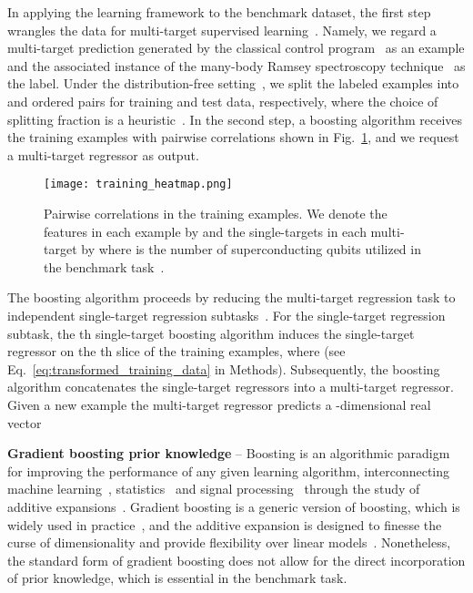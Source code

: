 \documentclass[aps,twocolumn,superscriptaddress,floatfix,preprintnumbers,showkeys]{revtex4}
\begin{document}
In applying the learning framework to the benchmark dataset, the first step wrangles the data for multi-target supervised learning~\cite{Borchani_2015, Waegeman_2019}. Namely, we regard a multi-target prediction generated by the classical control program~\cite{Roushan_2017, Neill_2018, Chiaro_2019} as an example and the associated instance of the many-body Ramsey spectroscopy technique~\cite{Roushan_2017} as the label. Under the distribution-free setting~\cite{Haussler_1992, Kearns_1994_1, Kearns_1994_2, Friedman_2001, Friedman_2003, Hastie_2009}, we split the labeled examples into  and  ordered pairs for training and test data, respectively, where the choice of splitting fraction is a heuristic~\cite{Ng_2020, Hastie_2009}. In the second step, a boosting algorithm receives the training examples with pairwise correlations shown in Fig.~\ref{fig:heatmap}, and we request a multi-target regressor  as output. 
\begin{figure}
\centering
\texttt{[image: training\_heatmap.png]}
\caption{Pairwise correlations in the training examples. We denote the features in each example by  and the single-targets in each multi-target by  where  is the number of superconducting qubits utilized in the benchmark task~\cite{Roushan_2017, Neill_2018, Chiaro_2019}.}
\label{fig:heatmap}
\end{figure}
The boosting algorithm proceeds by reducing the multi-target regression task to  independent single-target regression subtasks~\cite{Borchani_2015, Waegeman_2019}. For the  single-target regression subtask, the th single-target boosting algorithm induces the single-target regressor  on the th slice of the training examples, where  (see Eq.~\ref{eq:transformed_training_data} in Methods). Subsequently, the boosting algorithm concatenates the single-target regressors into a multi-target regressor. Given a new example  the multi-target regressor predicts a -dimensional real vector  

\textbf{Gradient boosting prior knowledge} -- Boosting is an algorithmic paradigm for improving the performance of any given learning algorithm, interconnecting machine learning~\cite{Powell_1987, Kearns_1988, Hastie_1990, Schapire_1990, Kearns_1994_3, Freund_1995, Freund_1997, Breiman_1997_1, Mason_1999, Schapire_2002, Chen_2016, Ke_2017}, statistics~\cite{Tukey_1977, Friedman_2000, Friedman_2001, Friedman_2003, Hastie_2009} and signal processing~\cite{Mallat_1993, Vincent_2002, Donoho_2012} through the study of additive expansions~\cite{Hastie_1990, Friedman_2000, Friedman_2001, Hastie_2009}. Gradient boosting is a generic version of boosting, which is widely used in practice~\cite{Friedman_2001, Friedman_2003, Hastie_2009, He_2014, Chen_2016, Ke_2017}, and the additive expansion is designed to finesse the curse of dimensionality and provide flexibility over linear models~\cite{Hastie_1990, Friedman_2000, Friedman_2001, Friedman_2003, Hastie_2009}. Nonetheless, the standard form of gradient boosting does not allow for the direct incorporation of prior knowledge, which is essential in the benchmark task.
\end{document}
